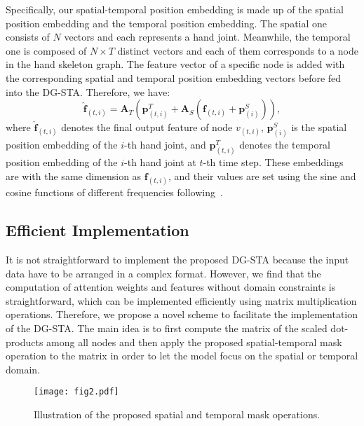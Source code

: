 \documentclass{bmvc2k}
\begin{document}
Specifically, our spatial-temporal position embedding is made up of  the spatial position embedding and the temporal position embedding. The spatial one consists of $N$ vectors and each  represents a hand joint. Meanwhile, the temporal one is composed of $N \times T$ distinct vectors and each of them corresponds to a node in the hand skeleton graph. The feature vector of a specific node is added with the corresponding spatial and temporal position embedding vectors before fed into the DG-STA. Therefore, we have: 
\begin{equation}
\hat{\mathbf{f}}_{(t,i)} = \mathbf{A}_T\left(\mathbf{p}_{(t,i)}^T + \mathbf{A}_S\left(\mathbf{f}_{(t,i)} + \mathbf{p}_{(i)}^S\right)\right),
\end{equation}
where $\hat{\mathbf{f}}_{(t,i)}$ denotes the final output feature of node $v_{(t,i)}$, $\mathbf{p}_{(i)}^S$ is the spatial position embedding of the $i$-th hand joint, and $\mathbf{p}_{(t,i)}^T$ denotes the temporal position embedding of the $i$-th hand joint at $t$-th time step. These embeddings are with the same dimension as $\textbf{f}_{(t,i)}$, and their values are set using the sine and cosine functions of different frequencies following~\cite{vaswani2017attention}.

\subsection{Efficient Implementation}
\label{sec:efficient_imp}

 It is not straightforward to implement the proposed DG-STA because the input data have to be arranged in a complex format. However, we find that the computation of attention weights and features without domain constraints is straightforward, which can be implemented efficiently using matrix multiplication operations. Therefore, we propose a novel scheme to facilitate the implementation of the DG-STA. The main idea is to first compute the matrix of the scaled dot-products among all nodes and then apply the proposed spatial-temporal mask operation to the matrix in order to let the model focus on the spatial or temporal domain. 
 
\begin{figure}[h]
\texttt{[image: fig2.pdf]}
\caption{Illustration of the proposed spatial and temporal mask operations.}
\label{fig:mask_op}
\end{figure}
 
\end{document}
